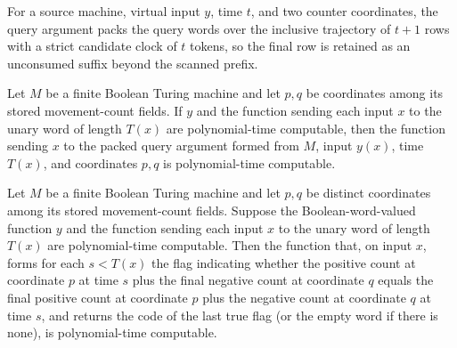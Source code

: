\begin{definition}
\label{Complexity.clSearchArg}
\leanok
{}
For a source machine, virtual input $y$, time $t$, and two counter coordinates, the query argument packs the query words over the inclusive trajectory of $t+1$ rows with a strict candidate clock of $t$ tokens, so the final row is retained as an unconsumed suffix beyond the scanned prefix.
\end{definition}

\begin{lemma}
\label{Complexity.clSearchArg_native}
\leanok
{}
Let $M$ be a finite Boolean Turing machine and let $p,q$ be coordinates among its stored
movement-count fields. If $y$ and the function sending each input $x$ to the unary word
of length $T(x)$ are polynomial-time computable, then the function sending $x$ to the
packed query argument formed from $M$, input $y(x)$, time $T(x)$, and coordinates $p,q$
is polynomial-time computable.
\end{lemma}

\begin{lemma}
\label{Complexity.clSearch_native}
\leanok
{}
Let $M$ be a finite Boolean Turing machine and let $p,q$ be distinct coordinates among
its stored movement-count fields. Suppose the Boolean-word-valued function $y$ and the
function sending each input $x$ to the unary word of length $T(x)$ are polynomial-time
computable. Then the function that, on input $x$, forms for each $s<T(x)$ the flag
indicating whether the positive count at coordinate $p$ at time $s$ plus the final
negative count at coordinate $q$ equals the final positive count at coordinate $p$ plus
the negative count at coordinate $q$ at time $s$, and returns the code of the last true
flag (or the empty word if there is none), is polynomial-time computable.
\end{lemma}

